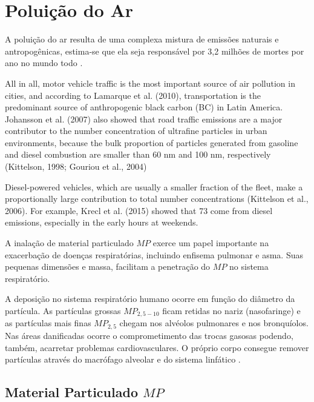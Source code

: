 \section{Poluição do Ar}

A poluição do ar resulta de uma complexa mistura de emissões naturais e 
antropogênicas, estima-se que ela seja responsável por 3,2 milhões de mortes 
por ano no mundo todo \citep{lim2013}. 

All in all, motor vehicle traffic is the most important
source of air pollution in cities, and according to Lamarque
et al. (2010), transportation is the predominant source of
anthropogenic black carbon (BC) in Latin America.
Johansson et al. (2007) also showed that road traffic emissions
are a major contributor to the number concentration of
ultrafine particles in urban environments, because the bulk
proportion of particles generated from gasoline and diesel
combustion are smaller than 60 nm and 100 nm, respectively
(Kittelson, 1998; Gouriou et al., 2004)

Diesel-powered
vehicles, which are usually a smaller fraction of the fleet,
make a proportionally large contribution to total number
concentrations (Kittelson et al., 2006). For example, Krecl et
al. (2015) showed that 73%
come from diesel emissions, especially in the early hours at
weekends.

A inalação de material particulado $MP$ exerce um papel importante na 
exacerbação de doenças respiratórias, incluindo enfisema pulmonar e asma. 
Suas pequenas dimensões e massa, facilitam a penetração do $MP$ no sistema 
respiratório. 

A deposição no sistema respiratório humano ocorre em função do diâmetro da 
partícula.
As partículas grossas $MP_{2,5-10}$ ficam retidas no nariz (nasofaringe) e
as partículas mais finas $MP_{2,5}$ chegam nos alvéolos pulmonares e 
nos bronquíolos.
Nas áreas danificadas ocorre o comprometimento das trocas gasosas podendo, 
também, acarretar problemas cardiovasculares.
O próprio corpo consegue remover partículas através do macrófago alveolar 
e do sistema linfático \citep{arbex2012}.


\subsection{Material Particulado $MP$}

